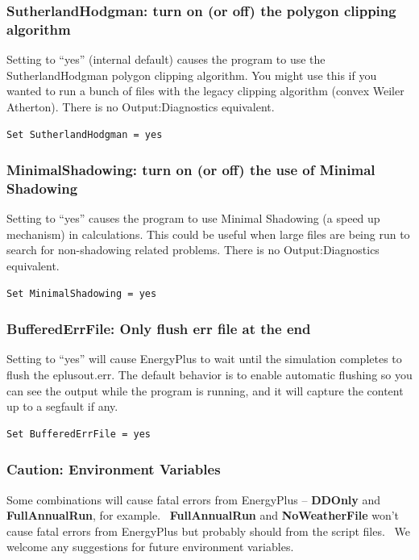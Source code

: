 \subsubsection{SutherlandHodgman: turn on (or off) the polygon clipping algorithm}\label{sutherlandhodgman-turn-on-or-off-the-polygon-clipping-algorithm}

Setting to ``yes'' (internal default) causes the program to use the SutherlandHodgman polygon clipping algorithm. You might use this if you wanted to run a bunch of files with the legacy clipping algorithm (convex Weiler Atherton). There is no Output:Diagnostics equivalent.

\begin{lstlisting}
Set SutherlandHodgman = yes
\end{lstlisting}

\subsubsection{MinimalShadowing: turn on (or off) the use of Minimal Shadowing}\label{minimalshadowing-turn-on-or-off-the-use-of-minimal-shadowing}

Setting to ``yes'' causes the program to use Minimal Shadowing (a speed up mechanism) in calculations. This could be useful when large files are being run to search for non-shadowing related problems. There is no Output:Diagnostics equivalent.

\begin{lstlisting}
Set MinimalShadowing = yes
\end{lstlisting}

\subsubsection{BufferedErrFile: Only flush err file at the end}\label{bufferederrfile-only-flush-err-file-at-the-end}

Setting to ``yes'' will cause EnergyPlus to wait until the simulation completes to flush the eplusout.err.
The default behavior is to enable automatic flushing so you can see the output while the program is running, and it will capture the content up to a segfault if any.

\begin{lstlisting}
Set BufferedErrFile = yes
\end{lstlisting}

\subsubsection{Caution: Environment Variables}\label{caution-environment-variables}

Some combinations will cause fatal errors from EnergyPlus -- \textbf{DDOnly} and \textbf{FullAnnualRun}, for example.~ \textbf{FullAnnualRun} and \textbf{NoWeatherFile} won't cause fatal errors from EnergyPlus but probably should from the script files.~ We welcome any suggestions for future environment variables.
